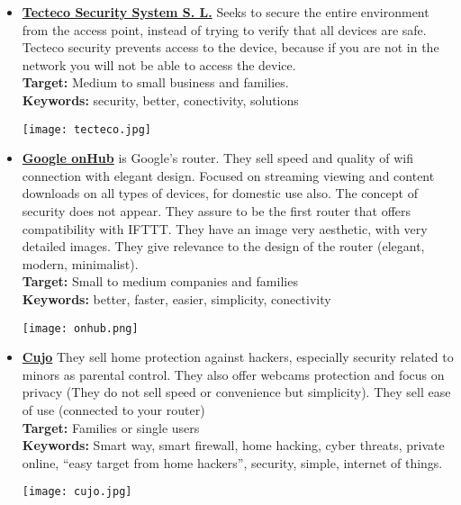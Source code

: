 \begin{itemize}
	\item \href{https://tecteco.com/}{\textbf{Tecteco Security System S. L.}} Seeks to secure the entire environment from the access point, instead of trying to verify that all devices are safe. Tecteco security prevents access to the device, because if you are not in the network you will not be able to access the device.\\
	\textbf {Target:} Medium to small business and families.\\
	\textbf{Keywords:} security, better, conectivity, solutions\\
	\begin{center}
		\texttt{[image: tecteco.jpg]}
	\end{center}
	
	\item \href{https://on.google.com/hub/}{\textbf{Google onHub}} is Google's router. They sell speed and quality of wifi connection with elegant design. Focused on streaming viewing and content downloads on all types of devices, for domestic use also. The concept of security does not appear. They assure to be the first router that offers compatibility with IFTTT. They have an image very aesthetic, with very detailed images. They give relevance to the design of the router (elegant, modern, minimalist).\\ 
	\textbf{Target:} Small to medium companies and families\\
	\textbf{Keywords:} better, faster, easier, simplicity, conectivity\\
	\begin{center}
		\texttt{[image: onhub.png]}
	\end{center}
	
	\item \href{https://www.getcujo.com/}{\textbf{Cujo}} They sell home protection against hackers, especially security related to minors as parental control. They also offer webcams protection and focus on privacy (They do not sell speed or convenience but simplicity). They sell ease of use (connected to your router)\\
	\textbf{Target:} Families or single users\\
	\textbf{Keywords:} Smart way, smart firewall, home hacking, cyber threats, private online, ``easy target from home hackers'', security, simple, internet of things.\\
	\begin{center}
		\texttt{[image: cujo.jpg]}
	\end{center}
	

\end{itemize}
